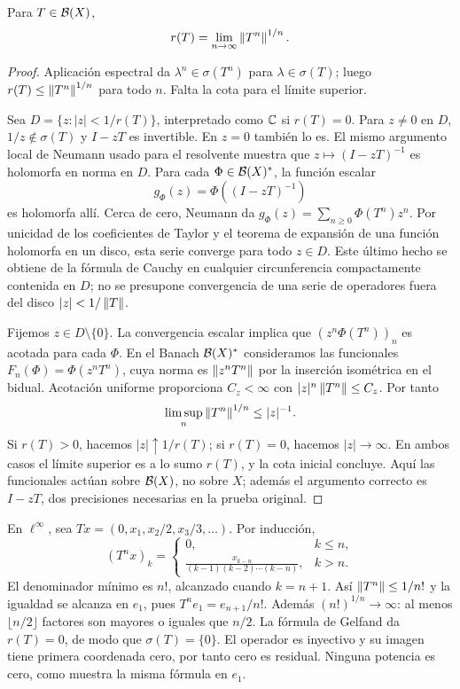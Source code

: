 \begin{teorema}\label{v3:gelfand-radio}
Para $T\in\mathcal B(X)$,
\[r(T)=\lim_{n\to\infty}\left\lVert T^n\right\rVert^{1/n}.
\]
\end{teorema}
\begin{proof}
Aplicación espectral da $\lambda^n\in\sigma(T^n)$ para $\lambda\in\sigma(T)$; luego $r(T)\le\left\lVert T^n\right\rVert^{1/n}$ para todo $n$. Falta la cota para el límite superior.

Sea $D=\{z:|z|<1/r(T)\}$, interpretado como $\mathbb C$ si $r(T)=0$. Para $z\ne0$ en $D$, $1/z\notin\sigma(T)$ y $I-zT$ es invertible. En $z=0$ también lo es. El mismo argumento local de Neumann usado para el resolvente muestra que $z\mapsto(I-zT)^{-1}$ es holomorfa en norma en $D$. Para cada $\Phi\in\mathcal B(X)^*$, la función escalar
\[g_\Phi(z)=\Phi((I-zT)^{-1})
\]
es holomorfa allí. Cerca de cero, Neumann da $g_\Phi(z)=\sum_{n\ge0}\Phi(T^n)z^n$. Por unicidad de los coeficientes de Taylor y el teorema de expansión de una función holomorfa en un disco, esta serie converge para todo $z\in D$. Este último hecho se obtiene de la fórmula de Cauchy en cualquier circunferencia compactamente contenida en $D$; no se presupone convergencia de una serie de operadores fuera del disco $|z|<1/\left\lVert T\right\rVert$.

Fijemos $z\in D\setminus\{0\}$. La convergencia escalar implica que $(z^n\Phi(T^n))_n$ es acotada para cada $\Phi$. En el Banach $\mathcal B(X)^*$ consideramos las funcionales $F_n(\Phi)=\Phi(z^nT^n)$, cuya norma es $\left\lVert z^nT^n\right\rVert$ por la inserción isométrica en el bidual. Acotación uniforme proporciona $C_z<\infty$ con $|z|^n\left\lVert T^n\right\rVert\le C_z$. Por tanto
\[\limsup_n\left\lVert T^n\right\rVert^{1/n}\le |z|^{-1}.
\]
Si $r(T)>0$, hacemos $|z|\uparrow1/r(T)$; si $r(T)=0$, hacemos $|z|\to\infty$. En ambos casos el límite superior es a lo sumo $r(T)$, y la cota inicial concluye. Aquí las funcionales actúan sobre $\mathcal B(X)$, no sobre $X$; además el argumento correcto es $I-zT$, dos precisiones necesarias en la prueba original.
\end{proof}

\begin{ejemplo}
En $\ell^\infty$, sea $Tx=(0,x_1,x_2/2,x_3/3,\ldots)$. Por inducción,
\[(T^nx)_k=\begin{cases}0,&k\le n,\\
\displaystyle\frac{x_{k-n}}{(k-1)(k-2)\cdots(k-n)},&k>n.
\end{cases}
\]
El denominador mínimo es $n!$, alcanzado cuando $k=n+1$. Así $\left\lVert T^n\right\rVert\le1/n!$ y la igualdad se alcanza en $e_1$, pues $T^ne_1=e_{n+1}/n!$. Además $(n!)^{1/n}\to\infty$: al menos $\lfloor n/2\rfloor$ factores son mayores o iguales que $n/2$. La fórmula de Gelfand da $r(T)=0$, de modo que $\sigma(T)=\{0\}$. El operador es inyectivo y su imagen tiene primera coordenada cero, por tanto cero es residual. Ninguna potencia es cero, como muestra la misma fórmula en $e_1$.
\end{ejemplo}

